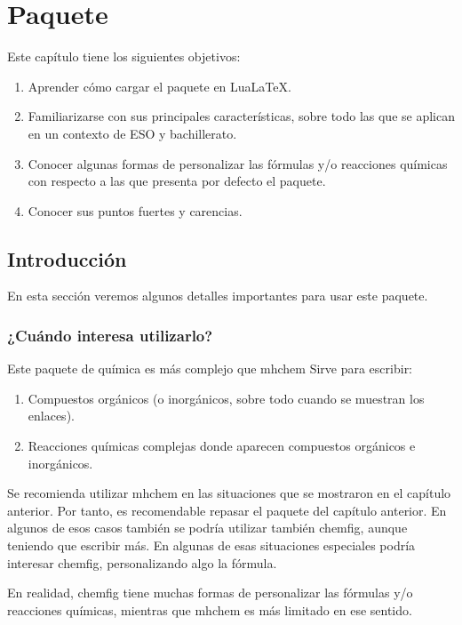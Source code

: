 %


\chapter{Paquete {}}
Este capítulo tiene los siguientes objetivos:
\begin{enumerate}
\item Aprender cómo cargar el paquete en Lua\LaTeX.
\item Familiarizarse con sus principales características, sobre todo las que se aplican
  en un contexto de ESO y bachillerato.
\item Conocer algunas formas de personalizar las fórmulas y/o reacciones químicas con
  respecto a las que presenta por defecto el paquete.
\item Conocer sus puntos fuertes y carencias.
\end{enumerate}

\section{Introducción}
En esta sección veremos algunos detalles importantes para usar este paquete.

\subsection{¿Cuándo interesa utilizarlo?}
Este paquete de química es más complejo que \textsf{mhchem}
Sirve para escribir:
\begin{enumerate}
\item Compuestos orgánicos (o inorgánicos, sobre todo cuando se muestran los enlaces).
\item Reacciones químicas complejas donde aparecen compuestos orgánicos e inorgánicos.
\end{enumerate}

Se recomienda utilizar \textsf{mhchem} en las situaciones que se mostraron en el
capítulo anterior. Por tanto, es recomendable repasar el paquete del capítulo anterior.
En algunos de esos casos también se podría utilizar también \textsf{chemfig}, aunque
teniendo que escribir más. En algunas de esas situaciones especiales podría interesar
\textsf{chemfig}, personalizando algo la fórmula.

En realidad, \textsf{chemfig} tiene muchas formas de personalizar las fórmulas y/o
reacciones químicas, mientras que \textsf{mhchem} es más limitado en ese sentido.

